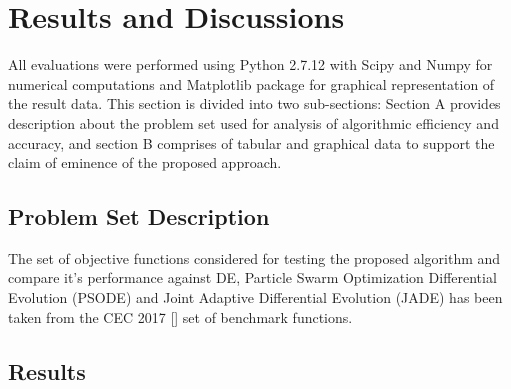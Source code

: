 \documentclass[conference]{IEEEtran}
\begin{document}


\section{Results and Discussions}

All evaluations were performed using Python 2.7.12 with Scipy and Numpy for numerical computations and Matplotlib package for graphical representation of the result data. This section is divided into two sub-sections: Section A provides description about the problem set used for analysis of algorithmic efficiency and accuracy, and section B comprises of tabular and graphical data to support the claim of eminence of the proposed approach.

\subsection{Problem Set Description}

The set of objective functions considered for testing the proposed algorithm and compare it's performance against DE, Particle Swarm Optimization Differential Evolution (PSODE) and Joint Adaptive Differential Evolution (JADE) has been taken from the CEC 2017 [] set of benchmark functions.



\subsection{Results}




%

%
\end{document}
